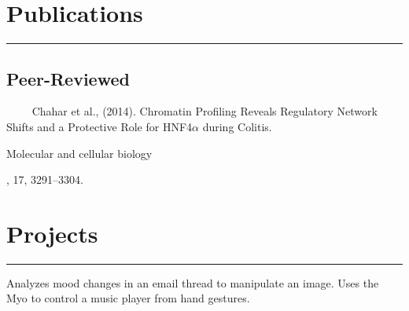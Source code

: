 \documentclass[letterpaper]{deedy-resume} %
\newcommand{\colorrule}[1]{%
\begingroup\color{#1}\hrule\endgroup%
}%
\begin{document}
\sectionspace %


\section{Publications}
\normalfont
\colorrule{black}
\vspace{2 mm}
\subsection{Peer-Reviewed}
\quad \ \ \textbullet{} \ \ Chahar et al., (2014). Chromatin Profiling Reveals Regulatory Network Shifts and a Protective Role for HNF4$\alpha$ during \hspace*{8 mm} Colitis. \begin{em}Molecular and cellular biology\end{em}, 17, 3291–3304.
%
%
\section{Projects}
\normalfont
\colorrule{black}
\vspace{2 mm}
\fontsize{10pt}{12pt}
Analyzes mood changes in an email thread to manipulate an image.
\hfill
{}
\hspace{2mm}
Uses the Myo to control a music player from hand gestures. 
\hfill
{}





\sectionspace
\end{document}
